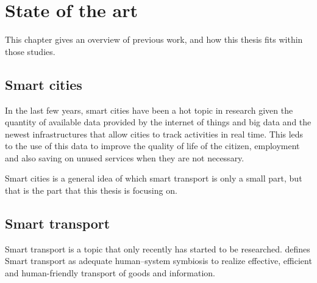 \chapter{State of the art}

This chapter gives an overview of previous work, and how this thesis fits within those studies.

\section{Smart cities}

In the last few years, smart cities have been a hot topic in research \cite{caragliu_bo_nijkamp_2011} given the quantity of available data provided by the internet of things \cite{zanella_bui_castellani_vangelista_zorzi_2014} and big data \cite{townsend_2013} and the newest infrastructures that allow cities to track activities in real time. This leds to the use of this data to improve the quality of life of the citizen, employment\cite{shapiro_2005} and also saving on unused services when they are not necessary.

Smart cities is a general idea of which smart transport is only a small part, but that is the part that this thesis is focusing on.

\section{Smart transport}

Smart transport is a topic that only recently has started to be researched. \cite{lenior_janssen_neerincx_schreibers_2006} defines Smart transport as \glqq adequate human–system symbiosis to realize effective, efficient and human-friendly transport of goods and information.\grqq






